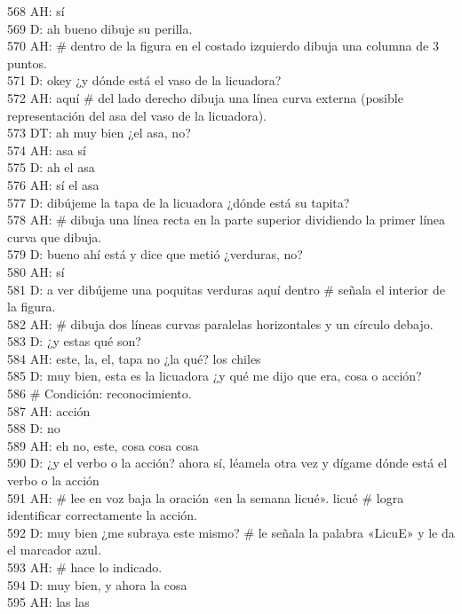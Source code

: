 568 AH: sí\\
569 D: ah bueno dibuje su perilla.\\
570 AH: \# dentro de la figura en el costado izquierdo dibuja una columna de 3 puntos.\\
571 D: okey ¿y dónde está el vaso de la licuadora?\\
572 AH: aquí \# del lado derecho dibuja una línea curva externa (posible representación del asa del vaso de la licuadora).\\
573 DT: ah muy bien ¿el asa, no?\\
574 AH: asa sí\\
575 D: ah el asa\\
576 AH: sí el asa\\
577 D: dibújeme la tapa de la licuadora ¿dónde está su tapita?\\
578 AH: \# dibuja una línea recta en la parte superior dividiendo la primer línea curva que dibuja.\\
579 D: bueno ahí está y dice que metió ¿verduras, no?\\
580 AH: sí\\
581 D: a ver dibújeme una poquitas verduras aquí dentro \# señala el interior de la figura.\\
582 AH: \# dibuja dos líneas curvas paralelas horizontales y un círculo debajo.\\
583 D: ¿y estas qué son?\\
584 AH: este, la, el, tapa no ¿la qué? los chiles\\
585 D: muy bien, esta es la licuadora ¿y qué me dijo que era, cosa o acción?\\
586 \# Condición: reconocimiento.\\
587 AH: acción\\
588 D: no\\
589 AH: eh no, este, cosa cosa cosa\\
590 D: ¿y el verbo o la acción? ahora sí, léamela otra vez y dígame dónde está el verbo o la acción\\
591 AH: \# lee en voz baja la oración «en la semana licué». licué \# logra identificar correctamente la acción.\\
592 D: muy bien ¿me subraya este mismo? \# le señala la palabra «LicuE» y le da el marcador azul.\\
593 AH: \# hace lo indicado.\\
594 D: muy bien, y ahora la cosa\\
595 AH: las las\\
